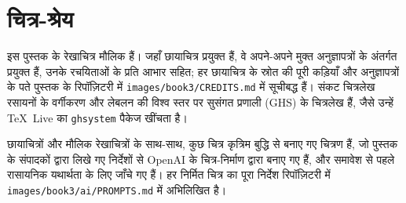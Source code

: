 \chapter*{चित्र-श्रेय}

इस पुस्तक के रेखाचित्र मौलिक हैं। जहाँ छायाचित्र प्रयुक्त हैं, वे अपने-अपने मुक्त
अनुज्ञापत्रों के अंतर्गत प्रयुक्त हैं, उनके रचयिताओं के प्रति आभार सहित; हर छायाचित्र के
स्रोत की पूरी कड़ियाँ और अनुज्ञापत्रों के पते पुस्तक के रिपॉज़िटरी में
\texttt{images/book3/CREDITS.md} में सूचीबद्ध हैं।
संकट चित्रलेख रसायनों के वर्गीकरण और लेबलन की विश्व स्तर पर सुसंगत प्रणाली (GHS) के
चित्रलेख हैं, जैसे उन्हें \TeX\ Live का \texttt{ghsystem} पैकेज खींचता है।

\bigskip
छायाचित्रों और मौलिक रेखाचित्रों के साथ-साथ, कुछ चित्र
कृत्रिम बुद्धि से बनाए गए चित्रण हैं, जो पुस्तक के संपादकों द्वारा लिखे गए निर्देशों से
OpenAI के चित्र-निर्माण द्वारा बनाए गए हैं, और समावेश से पहले रासायनिक
यथार्थता के लिए जाँचे गए हैं। हर निर्मित चित्र का पूरा निर्देश
रिपॉज़िटरी में \texttt{images/book3/ai/PROMPTS.md} में अभिलिखित है।

